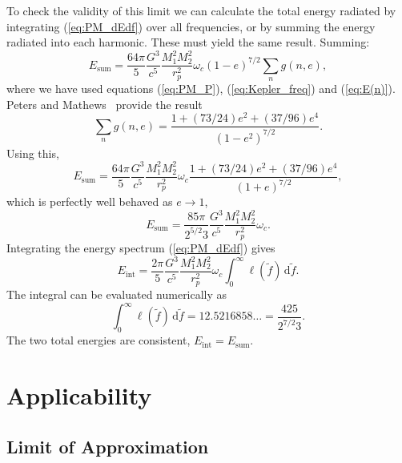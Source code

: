 \documentclass[aps,prd,amsfonts,amssymb,amsmath,nofootinbib,floatfix,reprint,showpacs,groupedaddress]{revtex4-1}
\newcommand{\eqnref}[1]{(\ref{eq:#1})}
\newcommand{\sub}[1]{\ensuremath{_\text{#1}}}
\newcommand{\dd}{\ensuremath{\mathrm{d}}}
\newcommand{\intd}[4]{\ensuremath{\int_{#1}^{#2}{#3}\,\dd{#4}}}
\begin{document}
To check the validity of this limit we can calculate the total energy radiated by integrating \eqnref{PM_dEdf} over all frequencies, or by summing the energy radiated into each harmonic. These must yield the same result. Summing:
\begin{equation}
E\sub{sum} = \frac{64\pi}{5}\frac{G^3}{c^5}\frac{M_1^2M_2^2}{r_{p}^2}\omega_{c}(1-e)^{7/2}\sum_n g(n,e),
\end{equation}
where we have used equations \eqnref{PM_P}, \eqnref{Kepler_freq} and \eqnref{E(n)}. Peters and Mathews~\cite{Peters1963} provide the result
\begin{equation}
\sum_n g(n,e) = \frac{1 + (73/24)e^2 + (37/96)e^4}{(1-e^2)^{7/2}}.
\end{equation}
Using this,
\begin{equation}
E\sub{sum} = \frac{64\pi}{5}\frac{G^3}{c^5}\frac{M_1^2M_2^2}{r_{p}^2}\omega_{c}\frac{1 + (73/24)e^2 + (37/96)e^4}{(1+e)^{7/2}},
\end{equation}
which is perfectly well behaved as $e \rightarrow 1$,
\begin{equation}
E\sub{sum} = \frac{85\pi}{2^{5/2}3}\frac{G^3}{c^5}\frac{M_1^2M_2^2}{r_{p}^2}\omega_{c}.
\label{eq:PM_total}
\end{equation}
Integrating the energy spectrum \eqnref{PM_dEdf} gives
\begin{equation}
E\sub{int} = \frac{2\pi}{5}\frac{G^3}{c^5}\frac{M_1^2M_2^2}{r_{p}^2}\omega_{c}\intd{0}{\infty}{\ell(\tilde{f})}{\tilde{f}}.
\end{equation}
The integral can be evaluated numerically as
\begin{equation}
\intd{0}{\infty}{\ell(\tilde{f})}{\tilde{f}} = 12.5216858\ldots = \frac{425}{2^{7/2}3}.
\end{equation}
The two total energies are consistent, $E\sub{int} = E\sub{sum}$.

\section{Applicability\label{sec:application}}

\subsection{Limit of Approximation}
\end{document}

